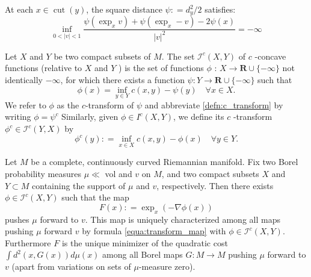 \begin{prop}
	\label{prop:distance_cut_locus}
	At each \( x \in \operatorname { cut } ( y ) \), the square distance \( \psi : = d _ { y } ^ { 2 } / 2 \) satisfies:
	\[ \inf _ { 0 < | v | < 1 } \frac { \psi \left( \exp _ { x } v \right) + \psi \left( \exp _ { x } - v \right) - 2 \psi ( x ) } { | v | ^ { 2 } } = - \infty \]
\end{prop}
\begin{defn} 
	Let \( X \) and \( Y \) be two compact subsets of \( M \). The set \( \mathcal{I} ^ { c } ( X , Y ) \) of \( c \) -concave functions (relative to \( X \) and \( Y \) ) is the set of functions \( \phi \) : \( X \rightarrow \mathbf { R } \cup \{ - \infty \} \) not identically \( - \infty \), for which there exists a function \( \psi : Y \rightarrow \mathbf { R } \cup \{ - \infty \} \) such that
	\begin{equation}
		\label{defn:c_transform}
		\phi ( x ) = \inf _ { y \in Y } c ( x , y ) - \psi ( y ) \quad \forall x \in X.
	\end{equation}
	We refer to \( \phi \) as the \( c \)-transform of \( \psi \) and abbreviate \cref{defn:c_transform} by writing \( \phi = \psi ^ { c } \)
	Similarly, given \( \phi \in I ^ { c } ( X , Y ) \), we define its \( c \) -transform \( \phi ^ { c } \in \mathcal{I} ^ { c } ( Y , X ) \) by
	\[ \phi ^ { c } ( y ) : = \inf _ { x \in X } c ( x , y ) - \phi ( x ) \quad \forall y \in Y. \]
\end{defn}

\begin{thm}
	Let \( M \) be a complete, continuously curved Riemannian manifold. Fix two Borel probability measures \( \mu \ll \) vol and \( v \) on \( M \), and two compact subsets \( X \) and \( Y \subset M \) containing the support of \( \mu \) and \( v \), respectively. Then there exists \( \phi \in \mathcal { I } ^ { c } ( X , Y ) \) such that the map
	\begin{equation}
		\label{equa:transform_map}
		F ( x ) : = \exp _ { x } ( - \nabla \phi ( x ) )
	\end{equation}
	pushes \( \mu \) forward to \( v \). This map is uniquely characterized among all maps pushing \( \mu \) forward \( v \) by formula \cref{equa:transform_map} with \( \phi \in \mathcal{I} ^ { c } ( X , Y ) . \) Furthermore \( F \) is the unique minimizer of the quadratic cost \( \int d ^ { 2 } ( x , G ( x ) ) d \mu ( x ) \) among all Borel maps \( G : M \rightarrow M \) pushing \( \mu \) forward to \( v \) (apart from variations on sets of \( \mu \)-measure zero).
\end{thm}

